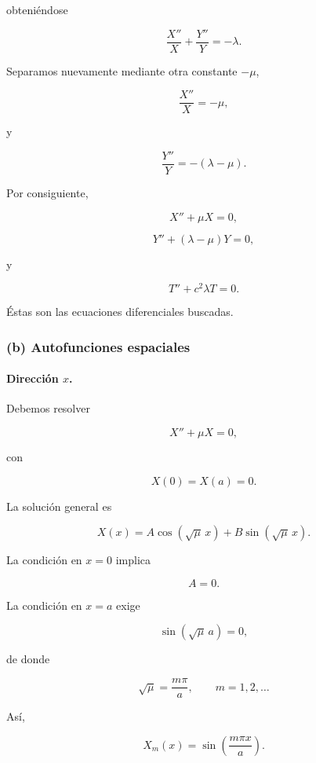 \documentclass[12pt]{article}
\begin{document}
obteniéndose

\begin{equation}
\frac{X''}{X}
+
\frac{Y''}{Y}
=
-\lambda.
\end{equation}

Separamos nuevamente mediante otra constante $-\mu$,

\begin{equation}
\frac{X''}{X}
=
-\mu,
\end{equation}

y

\begin{equation}
\frac{Y''}{Y}
=
-(\lambda-\mu).
\end{equation}

Por consiguiente,

\[
\boxed{
X''+\mu X=0,
}
\]

\[
\boxed{
Y''+(\lambda-\mu)Y=0,
}
\]

y

\[
\boxed{
T''+c^2\lambda T=0.
}
\]

Éstas son las ecuaciones diferenciales buscadas.

\subsubsection*{(b) Autofunciones espaciales}

\paragraph{Dirección $x$.}

Debemos resolver

\[
X''+\mu X=0,
\]

con

\[
X(0)=X(a)=0.
\]

La solución general es

\[
X(x)=A\cos(\sqrt{\mu}\,x)
+
B\sin(\sqrt{\mu}\,x).
\]

La condición en $x=0$ implica

\[
A=0.
\]

La condición en $x=a$ exige

\[
\sin(\sqrt{\mu}\,a)=0,
\]

de donde

\begin{equation}
\sqrt{\mu}
=
\frac{m\pi}{a},
\qquad
m=1,2,\ldots
\end{equation}

Así,

\begin{equation}
X_m(x)
=
\sin\!\left(\frac{m\pi x}{a}\right).
\end{equation}
\end{document}
